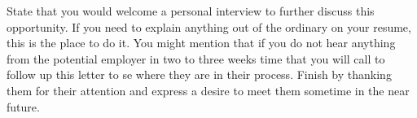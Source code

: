 \documentclass[11pt, a4paper]{awesome-cv}
\begin{document}
\begin{cvletter}
State that you would welcome a personal interview to further discuss this opportunity.
If you need to explain anything out of the ordinary on your resume, this is the place to do it.
You might mention that if you do not hear anything from the potential employer in two to three weeks time
  that you will call to follow up this letter to se where they are in their process.
Finish by thanking them for their attention and express a desire to meet them sometime in the near future.

\end{cvletter}

\makeletterclosing
\end{document}
